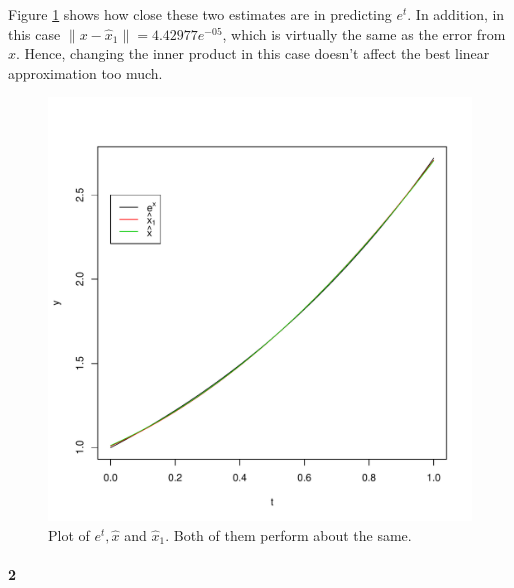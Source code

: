 \documentclass[12pt, leqno]{article}
\providecommand{\norm}[1]{\lVert#1\rVert} %
\begin{document}
Figure \ref{fig:hw1p1-2} shows how close these two estimates are in predicting $e^t$. In addition, in this case $\norm{x-\hat{x}_1} = 4.42977e^{-05}$, which is virtually the same as the error from $\hat{x}$. Hence, changing the inner product in this case doesn't affect the best linear approximation too much.

\begin{figure}[H]
\begin{center}
  \includegraphics[scale=0.4]{hw1p1-2.pdf}
\end{center}
\caption{Plot of  $e^t, \hat{x}$ and $\hat{x}_1$. Both of them perform about the same.} 
\label{fig:hw1p1-2}
\end{figure}

\paragraph{2}
\end{document}
